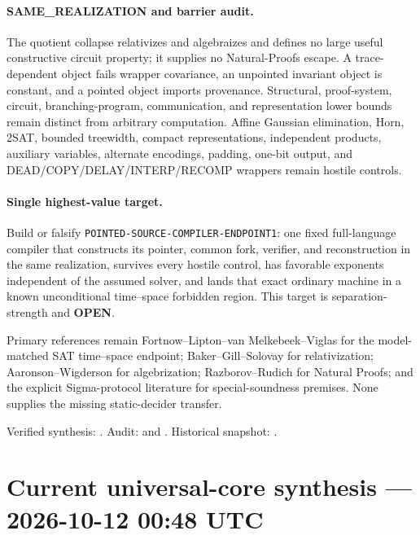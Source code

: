 \documentclass[11pt]{article}
\newcommand{\statusopen}{\textcolor{openstatus}{\textbf{OPEN}}}
\begin{document}
\paragraph{SAME\_REALIZATION and barrier audit.}
The quotient collapse relativizes and algebraizes and defines no large useful
constructive circuit property; it supplies no Natural-Proofs escape. A
trace-dependent object fails wrapper covariance, an unpointed invariant
object is constant, and a pointed object imports provenance. Structural,
proof-system, circuit, branching-program, communication, and representation
lower bounds remain distinct from arbitrary computation. Affine Gaussian
elimination, Horn, 2SAT, bounded treewidth, compact representations,
independent products, auxiliary variables, alternate encodings, padding,
one-bit output, and DEAD/COPY/DELAY/INTERP/RECOMP wrappers remain hostile
controls.

\paragraph{Single highest-value target.}
Build or falsify \texttt{POINTED-SOURCE-COMPILER-ENDPOINT1}: one fixed
full-language compiler that constructs its pointer, common fork, verifier,
and reconstruction in the same realization, survives every hostile control,
has favorable exponents independent of the assumed solver, and lands that
exact ordinary machine in a known unconditional time--space forbidden region.
This target is separation-strength and \statusopen.

Primary references remain Fortnow--Lipton--van Melkebeek--Viglas for the
model-matched SAT time--space endpoint; Baker--Gill--Solovay for
relativization; Aaronson--Wigderson for algebrization; Razborov--Rudich for
Natural Proofs; and the explicit Sigma-protocol literature for
special-soundness premises. None supplies the missing static-decider transfer.

Verified synthesis:
.
Audit:
 and
.
Historical snapshot:
.

\clearpage

\section{Current universal-core synthesis --- 2026-10-12 00:48 UTC}
\end{document}
